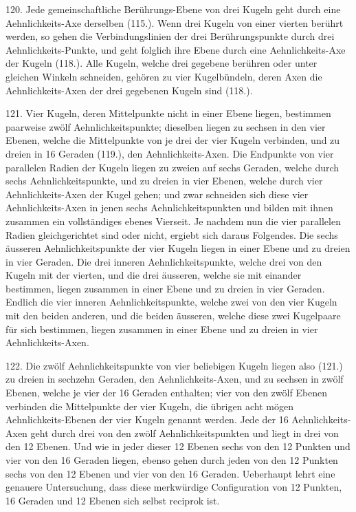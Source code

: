 120. Jede gemeinschaftliche Ber\"uhrungs-Ebene von drei
Kugeln geht durch eine Aehnlichkeits-Axe derselben (115.).
Wenn drei Kugeln von einer vierten ber\"uhrt werden, so
gehen die Verbindungslinien der drei Ber\"uh\-rungs\-punkte
durch drei Aehnlichkeits-Punkte, und geht folglich ihre Ebene
durch eine Aehnlichkeits-Axe der Kugeln (118.). Alle Kugeln,
welche drei gegebene ber\"uhren oder unter gleichen Winkeln
schneiden, geh\"oren zu vier Kugelb\"undeln, deren Axen die
Aehnlichkeits-Axen der drei gegebenen Kugeln sind (118.).

121. Vier Kugeln, deren Mittelpunkte nicht in einer
Ebene liegen, bestimmen paarweise zw\"olf Aehnlichkeitspunkte;
dieselben liegen zu sechsen in den vier Ebenen,
welche die Mittelpunkte von je drei der vier Kugeln verbinden,
und zu dreien in 16 Geraden (119.), den Aehnlichkeits-Axen.
Die Endpunkte von vier parallelen Radien
der Kugeln liegen zu zweien auf sechs Geraden, welche durch
sechs Aehnlichkeitspunkte, und zu dreien in vier Ebenen,
welche durch vier Aehnlichkeits-Axen der Kugel gehen; und
zwar schneiden sich diese vier Aehnlichkeits-Axen in jenen
sechs Aehnlichkeitspunkten und bilden mit ihnen zusammen
ein vollst\"andiges ebenes Vierseit. Je nachdem nun die vier
parallelen Radien gleichgerichtet sind oder nicht, ergiebt
sich daraus Folgendes. Die sechs \"ausseren Aehnlichkeitspunkte
der vier Kugeln liegen in einer Ebene und zu dreien
in vier Geraden. Die drei inneren Aehnlichkeitspunkte, welche
drei von den Kugeln mit der vierten, und die drei \"ausseren,
welche sie mit einander bestimmen, liegen zusammen in
einer Ebene und zu dreien in vier Geraden. Endlich die
vier inneren Aehnlichkeitspunkte, welche zwei von den vier
Kugeln mit den beiden anderen, und die beiden \"ausseren,
welche diese zwei Kugelpaare f\"ur sich bestimmen, liegen
zusammen in einer Ebene und zu dreien in vier Aehnlichkeits-Axen.

122. Die zw\"olf Aehnlichkeitspunkte von vier beliebigen
Kugeln liegen also (121.) zu dreien in sechzehn Geraden,
den Aehnlichkeits-Axen, und zu sechsen in zw\"olf Ebenen,
welche je vier der 16 Geraden enthalten; vier von den zw\"olf
Ebenen verbinden die Mittelpunkte der vier Kugeln, die
\"ubrigen acht m\"ogen {\glqq}Aehnlichkeits-Ebenen{\grqq} der vier Kugeln
genannt werden. Jede der 16 Aehnlichkeits-Axen geht durch
drei von den zw\"olf Aehnlichkeitspunkten und liegt in drei
von den 12 Ebenen. Und wie in jeder dieser 12 Ebenen
sechs von den 12 Punkten und vier von den 16 Geraden
liegen, ebenso gehen durch jeden von den 12 Punkten sechs
von den 12 Ebenen und vier von den 16 Geraden. Ueberhaupt
lehrt eine genauere Untersuchung, dass diese merkw\"urdige
Configuration von 12 Punkten, 16 Geraden und 12
Ebenen sich selbst reciprok ist.

